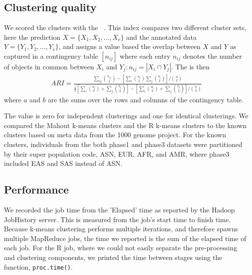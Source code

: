 \documentclass{bioinfo}
\begin{document}
\begin{methods}
\subsection*{Clustering quality}
We scored the clusters with the \ARI{}~\cite{Hubert1985}. 
This index compares two different cluster sets, here the prediction $X = \{ X_1, X_2, \ldots , X_r \}$ and the annotated data $Y = \{ Y_1, Y_2, \ldots , Y_s \}$, and assigns a value based the overlap between $X$ and $Y$ as captured in a contingency table $\left[n_{ij}\right]$ where each entry $n_{ij}$ denotes the number of objects in common between $X_i$ and $Y_j : n_{ij}=|X_i \cap Y_j|$. 
The \ARI{} is then 
{\tiny
\begin{eqnarray*}
ARI=\frac{\sum_{ij}{{n_{ij}\choose 2}} - \left[ \sum_{i}{{a_i\choose2}} \sum_{j}{{b_i\choose2}} \right] / {n\choose2}}{\frac{1}{2} \left[ \sum_{i}{{a_{i}\choose 2} + \sum_{j}{{b_{j}\choose 2}}} \right] - \left[ \sum_{i}{{a_{i}\choose 2} + \sum_{j}{{b_{j}\choose 2}}} \right] / {n\choose2}} 
\end{eqnarray*}
}
where $a$ and $b$ are the sums over the rows and columns of the contingency table.

The value is zero for independent clusterings and one for identical clusterings. 
We compared the Mahout k-means clusters and the R k-means clusters to the known clusters based on meta data from the 1000 genome project.
For the known clusters, individuals from the both phase1 and phase3 datasets were partitioned by their super population code, ASN, EUR, AFR, and AMR, where phase3 included EAS and SAS instead of ASN.



\subsection*{Performance}
We recorded the job time from the 'Elapsed' time as reported by the Hadoop JobHistory server. This is measured from the job's start time to finish time.
Because k-means clustering performs multiple iterations, and therefore spawns multiple MapReduce jobs, the time we reported is the sum of the elapsed time of each job.
For the R job, where we could not easily separate the pre-processing and clustering components, we printed the time between
stages using the function, \texttt{proc.time()}.

\end{methods}
\end{document}
